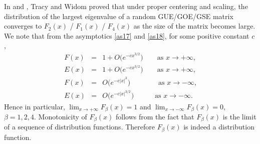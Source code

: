 In \cite{TW1} and \cite{TW2},
Tracy and Widom proved that under proper centering
and scaling, the distribution of the largest eigenvalue of
a random GUE/GOE/GSE matrix converges to $F_2(x)$ / $F_1(x)$ / $F_4(x)$
as the size of the matrix becomes large.
We note that from the asymptotics \eqref{as17} and \eqref{as18},
for some positive constant $c$,
\begin{eqnarray}
\label{as46}   F(x) &=& 1+ O\bigl( e^{-cx^{3/2}}\bigr)
\qquad \text{as $x\to+\infty$,}\\
\label{as47}   E(x) &=& 1+ O\bigl( e^{-cx^{3/2}}\bigr)
\qquad \text{as $x\to+\infty$,}\\
\label{as48}   F(x) &=& O\bigl( e^{-c|x|^{3}}\bigr)
\qquad\qquad \text{as $x\to-\infty$,}\\
\label{as49}   E(x) &=& O\bigl( e^{-c|x|^{3/2}}\bigr)
\quad\qquad \text{as $x\to-\infty$.}
\end{eqnarray}
Hence in particular, $\lim_{x\to+\infty} F_\beta(x) = 1$ and
$\lim_{x\to-\infty} F_\beta(x) = 0$, $\beta=1,2,4$.
Monotonicity of $F_\beta(x)$ follows from the fact that $F_\beta(x)$
is the limit of a sequence of distribution functions.
Therefore $F_\beta(x)$ is indeed a distribution function.



